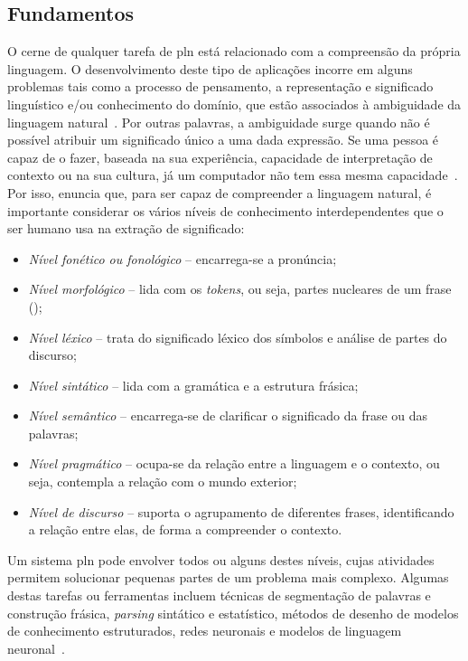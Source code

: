 \subsection{Fundamentos}
O cerne de qualquer tarefa de \gls{pln} está relacionado com a compreensão da própria linguagem. O desenvolvimento deste tipo de aplicações incorre em alguns problemas tais como a processo de pensamento, a representação e significado linguístico e/ou conhecimento do domínio, que estão associados à ambiguidade da linguagem natural~\parencite{nlp, pln_extracao_conhecimento}. Por outras palavras, a ambiguidade surge quando não é possível atribuir um significado único a uma dada expressão. Se uma pessoa é capaz de o fazer, baseada na sua experiência, capacidade de interpretação de contexto ou na sua cultura, já um computador não tem essa mesma capacidade~\parencite{pln_extracao_conhecimento}. Por isso, \textcite{nlp} enuncia que, para ser capaz de compreender a linguagem natural, é importante considerar os vários níveis de conhecimento interdependentes que o ser humano usa na extração de significado:

\begin{itemize}
    \item 
    {
        \textit{Nível fonético ou fonológico} -- encarrega-se a pronúncia;
    }
    \item
    {
        \textit{Nível morfológico} -- lida com os \textit{tokens}, ou seja, partes nucleares de um frase ();
    }
    \item
    {
        \textit{Nível léxico} -- trata do significado léxico dos símbolos e análise de partes do discurso;
    }
    \item 
    {
        \textit{Nível sintático} -- lida com a gramática e a estrutura frásica;
    }
    \item
    {
        \textit{Nível semântico} -- encarrega-se de clarificar o significado da frase ou das palavras;
    }
    \item
    {
        \textit{Nível pragmático} -- ocupa-se da relação entre a linguagem e o contexto, ou seja, contempla a relação com o mundo exterior;
    }
    \item
    {
        \textit{Nível de discurso} -- suporta o agrupamento de diferentes frases, identificando a relação entre elas, de forma a compreender o contexto.
    }
\end{itemize}

Um sistema \gls{pln} pode envolver todos ou alguns destes níveis, cujas atividades permitem solucionar pequenas partes de um problema mais complexo. Algumas destas tarefas ou ferramentas incluem técnicas de segmentação de palavras e construção frásica, \textit{parsing} sintático e estatístico, métodos de desenho de modelos de conhecimento estruturados, redes neuronais e modelos de linguagem neuronal~\parencite{nlp, speech_language_processing}.

